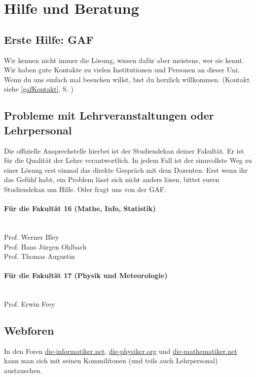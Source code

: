 ﻿
\section{Hilfe und Beratung}

\subsection{Erste Hilfe: GAF}

Wir kennen nicht immer die Lösung, wissen dafür aber meistens, wer sie
kennt. Wir haben gute Kontakte zu vielen Institutionen und Personen an
dieser Uni. Wenn du uns einfach mal besuchen willst, bist du herzlich
willkommen. (Kontakt siehe \ref{gafKontakt}, S. \pageref{gafKontakt})

\subsection{Probleme mit Lehrveranstaltungen oder Lehrpersonal}

Die offizielle Ansprechstelle hierbei ist der Studiendekan deiner
Fakultät.  Er ist für die Qualität der Lehre verantwortlich. In jedem
Fall ist der sinnvollste Weg zu einer Lösung erst einmal das direkte
Gespräch mit dem Dozenten. Erst wenn ihr das Gefühl habt, ein Problem
lässt sich nicht anders lösen, bittet euren Studiendekan um
Hilfe. Oder fragt uns von der GAF.

\paragraph{Für die Fakultät 16 (Mathe, Info, Statistik)}\hfill\\
Prof. Werner Bley\\
Prof. Hans Jürgen Ohlbach\\
Prof. Thomas Augustin

\paragraph{Für die Fakultät 17 (Physik und Meteorologie)}\hfill\\
Prof. Erwin Frey

\subsection{Webforen}

In den Foren \url{die-informatiker.net}, \url{die-physiker.org}
und \url{die-mathematiker.net} kann man sich mit seinen Kommilitonen
(und teils auch Lehrpersonal) austauschen.


